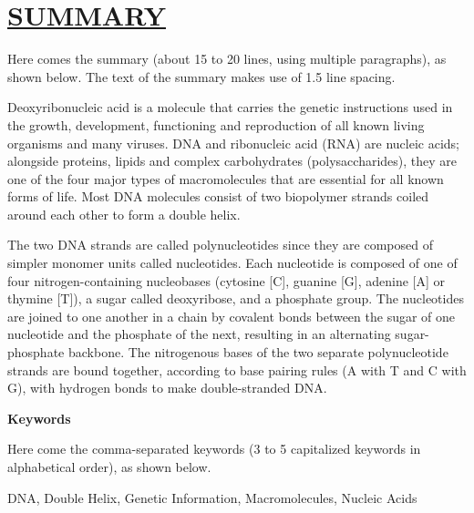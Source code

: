 \documentclass[fontsize=13pt]{scrartcl}
\begin{document}
{{{{{{{\section*{\uline{SUMMARY}}
Here comes the summary (about 15 to 20 lines, using multiple paragraphs), as shown below. The text of the summary makes use of 1.5 line spacing.

\bigskip

\noindent Deoxyribonucleic acid is a molecule that carries the genetic instructions used in the growth, development, functioning and reproduction of all known living organisms and many viruses. DNA and ribonucleic acid (RNA) are nucleic acids; alongside proteins, lipids and complex carbohydrates (polysaccharides), they are one of the four major types of macromolecules that are essential for all known forms of life. Most DNA molecules consist of two biopolymer strands coiled around each other to form a double helix.

\bigskip

\noindent The two DNA strands are called polynucleotides since they are composed of simpler monomer units called nucleotides. Each nucleotide is composed of one of four nitrogen-containing nucleobases (cytosine [C], guanine [G], adenine [A] or thymine [T]), a sugar called deoxyribose, and a phosphate group. The nucleotides are joined to one another in a chain by covalent bonds between the sugar of one nucleotide and the phosphate of the next, resulting in an alternating sugar-phosphate backbone. The nitrogenous bases of the two separate polynucleotide strands are bound together, according to base pairing rules (A with T and C with G), with hydrogen bonds to make double-stranded DNA.

\vspace{1cm}

\noindent\textbf{Keywords}

\bigskip

\noindent Here come the comma-separated keywords (3 to 5 capitalized keywords in alphabetical order), as shown below.

\bigskip

\noindent DNA, Double Helix, Genetic Information, Macromolecules, Nucleic Acids
\pagebreak
\clearpage\mbox{}\clearpage
}}}}}}}
\end{document}
